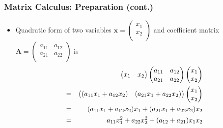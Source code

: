 \documentclass[pdflatex, 12pt]{beamer}
\begin{document}
\begin{frame}
\frametitle{Matrix Calculus: Preparation (cont.)}
\begin{itemize}
\item Quadratic form of two variables $\bm{x} = \begin{pmatrix}
x_1 \\
x_2 \\
\end{pmatrix}$ and coefficient matrix $\bm{A} = \begin{pmatrix}
a_{11} & a_{12} \\
a_{21} & a_{22} \\
\end{pmatrix}$ is
 \begin{eqnarray}
 && \begin{pmatrix}
 x_1 & x_2 \\
 \end{pmatrix} \begin{pmatrix}
 a_{11} & a_{12} \\
 a_{21} & a_{22} \\
 \end{pmatrix} \begin{pmatrix}
 x_1 \\
 x_2 \\
 \end{pmatrix} \notag \\
 &=& \begin{pmatrix}
 (a_{11} x_1 + a_{12} x_2) & (a_{21} x_1 + a_{22} x_2)
 \end{pmatrix} \begin{pmatrix}
 x_1 \\
 x_2 \\
 \end{pmatrix} \notag \\
 &=& (a_{11} x_1 + a_{12} x_2)x_1 + (a_{21} x_1 + a_{22} x_2) x_2 \notag \\
 &=& a_{11} x_1^2 + a_{22} x_2^2 + (a_{12} + a_{21}) x_1 x_2 \notag
 \end{eqnarray}
\end{itemize}
\end{frame}
\end{document}
